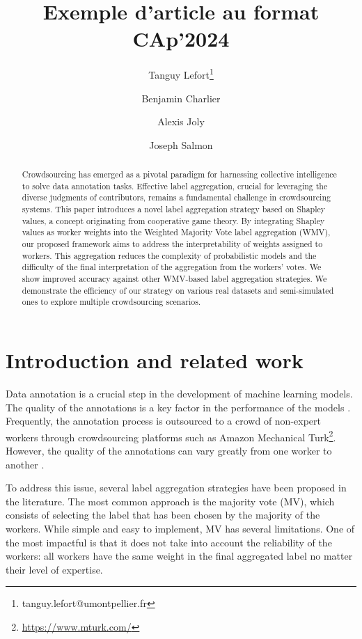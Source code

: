 \documentclass{cap2024}
\title{Exemple d'article au format CAp'2024}
\author[1]{Tanguy Lefort\thanks{tanguy.lefort@umontpellier.fr}}
\author[2]{Benjamin Charlier}
\author[3]{Alexis Joly}
\author[4]{Joseph Salmon}
\affil[1]{University of Montpellier, IMAG, CNRS, LIRMM, Inria}
\affil[2]{University of Montpellier, IMAG, CNRS}
\affil[3]{LIRMM, Inria}
\affil[4]{University of Montpellier, IMAG, CNRS, Institut Universitaire de France (IUF)}
\begin{document}
\maketitle

\begin{abstract}
  Crowdsourcing has emerged as a pivotal paradigm for harnessing collective intelligence to solve data annotation tasks. Effective label aggregation, crucial for leveraging the diverse judgments of contributors, remains a fundamental challenge in crowdsourcing systems. This paper introduces a novel label aggregation strategy based on Shapley values, a concept originating from cooperative game theory. By integrating Shapley values as worker weights into the Weighted Majority Vote label aggregation (WMV), our proposed framework aims to address the interpretability of weights assigned to workers. This aggregation reduces the complexity of probabilistic models and the difficulty of the final interpretation of the aggregation from the workers' votes. We show improved accuracy against other WMV-based label aggregation strategies. We demonstrate the efficiency of our strategy on various real datasets and semi-simulated ones to explore multiple crowdsourcing scenarios.
\medskip

\end{abstract}


\section{Introduction and related work}
\label{sec:intro}

Data annotation is a crucial step in the development of machine learning models. The quality of the annotations is a key factor in the performance of the models \citep{snow_cheap_2008}.
Frequently, the annotation process is outsourced to a crowd of non-expert workers through crowdsourcing platforms such as Amazon Mechanical Turk\footnote{\url{https://www.mturk.com/}}.
However, the quality of the annotations can vary greatly from one worker to another \citep{ross2009turkers,ipeirotis2010quality,hara2018data}.

To address this issue, several label aggregation strategies have been proposed in the literature.
The most common approach is the majority vote (MV), which consists of selecting the label that has been chosen by the majority of the workers.
While simple and easy to implement, MV has several limitations.
One of the most impactful is that it does not take into account the reliability of the workers: all workers have the same weight in the final aggregated label no matter their level of expertise.
\end{document}
